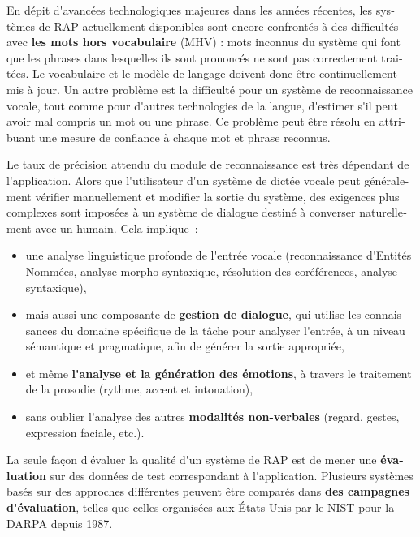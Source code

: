 \begin{french}
\begin{multicols}{2}
En dépit d{\mbox '}avancées technologiques majeures dans les années récentes,
les systèmes de RAP actuellement disponibles sont encore confrontés à
des difficultés avec {\bf les mots hors vocabulaire} (MHV) : mots
inconnus du système qui font que les phrases dans lesquelles ils sont
prononcés ne sont pas correctement traitées. Le vocabulaire et le
modèle de langage doivent donc être continuellement mis à jour. Un
autre problème est la difficulté pour un système de reconnaissance
vocale, tout comme pour d{\mbox '}autres technologies de la langue,
d{\mbox '}estimer s{\mbox '}il peut avoir mal compris un mot ou une phrase. Ce
problème peut être résolu en attribuant une mesure de confiance à
chaque mot et phrase reconnus.

Le taux de précision attendu du module de reconnaissance est très
dépendant de l{\mbox '}application. Alors que l{\mbox '}utilisateur d{\mbox '}un système de
dictée vocale peut généralement vérifier manuellement et modifier la
sortie du système, des exigences plus complexes sont imposées à un
système de dialogue destiné à converser naturellement avec un
humain. Cela implique~: 
\begin{itemize}
\item une analyse linguistique profonde de l{\mbox '}entrée vocale
  (reconnaissance d{\mbox '}Entités Nommées, analyse morpho-syntaxique,
  résolution des coréférences, analyse syntaxique),
\item mais aussi une composante de {\bf gestion de dialogue}, qui
  utilise les connaissances du domaine spécifique de la tâche pour
  analyser l{\mbox '}entrée, à un niveau sémantique et pragmatique, afin de
  générer la sortie appropriée,
\item et même {\bf l{\mbox '}analyse et la génération des émotions}, à
  travers le traitement de la prosodie (rythme, accent et intonation),
\item sans oublier l{\mbox '}analyse des autres {\bf modalités non-verbales}
  (regard, gestes, expression faciale, etc.).
\end{itemize}

La seule façon d{\mbox '}évaluer la qualité d{\mbox '}un système de RAP est de mener
une {\bf évaluation} sur des données de test correspondant à
l{\mbox '}application. Plusieurs systèmes basés sur des approches différentes
peuvent être comparés dans {\bf des campagnes d{\mbox '}évaluation}, telles que
celles organisées aux États-Unis par le NIST pour la DARPA depuis 1987.


\end{multicols}
\end{french}
